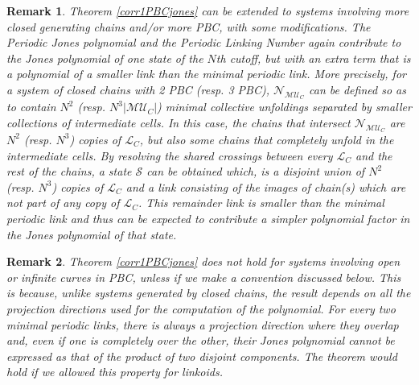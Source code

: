 \documentclass{article}
\newtheorem{remark}{Remark}[section]
\begin{document}
\begin{remark}\label{rem-23pbc-more}
Theorem \ref{corr1PBCjones} can be extended to systems involving more closed generating chains and/or more PBC, with some modifications. The Periodic Jones polynomial and the Periodic Linking Number again contribute to the Jones polynomial of one state of the $N$th cutoff, but with an extra term that is a polynomial of a smaller link than the minimal periodic link. More precisely, for a system of closed chains with 2 PBC (resp. 3 PBC), $\mathcal{N}_{\mathcal{MU}_C}$ can be defined so as to contain $N^2$ (resp. $N^3|\mathcal{MU}_C|$) minimal collective unfoldings separated by smaller collections of intermediate cells. In this case, the chains that intersect $\mathcal{N}_{\mathcal{MU}_C}$ are $N^2$ (resp. $N^3$) copies of $\mathcal{L}_C$, but also some chains that completely unfold in the intermediate cells. By resolving the shared crossings between every $\mathcal{L}_C$ and the rest of the chains, a state $\mathcal{S}$ can be obtained which, is a disjoint union of $N^2$ (resp. $N^3$) copies of $\mathcal{L}_C$ and a link consisting of the images of chain(s) which are not part of any copy of $\mathcal{L}_C$. This remainder link is smaller than the minimal periodic link and thus can be expected to contribute a simpler polynomial factor in the Jones polynomial of that state.
\end{remark}

\begin{remark}
Theorem \ref{corr1PBCjones} does not hold for systems involving open or infinite curves in PBC, unless if we make a convention discussed below. This is because, unlike systems generated by closed chains, the result depends on all the projection directions used for the computation of the polynomial. For every two minimal periodic links, there is always a projection direction where they overlap and, even if one is completely over the other, their Jones polynomial cannot be expressed as that of the product of two disjoint components. The theorem would hold if we allowed this property for linkoids.
\end{remark}
\end{document}
